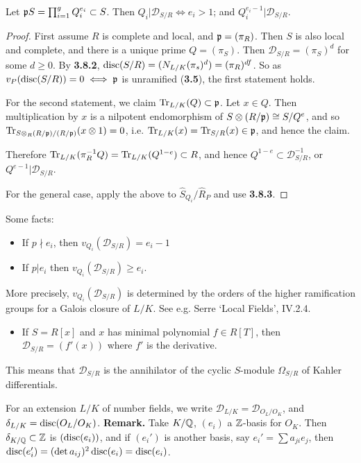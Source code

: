 \documentclass[10pt,a4paper]{article}
\begin{document}
\begin{theorem}
  Let $\mathfrak{p} S = \prod_{i=1}^g Q_i^{e_i} \subset S$. Then $Q_i | \mathscr{D}_{S/R} \iff e_i >1$; and $Q_i^{e_i-1}|\mathscr{D}_{S/R}$.
\end{theorem}
\begin{proof}
  First assume $R$ is complete and local, and $\mathfrak{p} = (\pi_R)$. Then $S$ is also local and complete, and there is a unique prime $Q = (\pi_S)$. Then $\mathscr{D}_{S/R} = (\pi_S)^d$ for some $d \geq 0$. By \textbf{3.8.2}, $\operatorname{disc}(S/R) = (N_{L/K}(\pi_s)^d) = (\pi_R)^{df}$. So as $v_P(\operatorname{disc}(S/R)) = 0 \iff \mathfrak{p}$ is unramified (\textbf{3.5}), the first statement holds.

  For the second statement, we claim $\operatorname{Tr}_{L/K}(Q) \subset \mathfrak{p}$. Let $x \in Q$. Then multiplication by $x$ is a nilpotent endomorphism of $S \otimes (R/\mathfrak{p}) \cong S/Q^e$, and so $\operatorname{Tr}_{S \otimes_R (R/\mathfrak{p})/(R/\mathfrak{p})}(x\otimes 1) = 0$, i.e. $\operatorname{Tr}_{L/K}(x) = \operatorname{Tr}_{S/R}(x) \in \mathfrak{p}$, and hence the claim.

  Therefore $\operatorname{Tr}_{L/K}(\pi_R^{-1}Q) = \operatorname{Tr}_{L/K}(Q^{1-e}) \subset R$, and hence $Q^{1-e} \subset \mathscr{D}_{S/R}^{-1}$, or $Q^{e-1}| \mathscr{D}_{S/R}$.

  For the general case, apply the above to $\hat{S}_{Q_i}/\hat{R}_P$ and use \textbf{3.8.3}.
\end{proof}
Some facts:
\begin{itemize}
  \item If $p\nmid e_i$, then $v_{Q_i}(\mathscr{D}_{S/R}) = e_i-1$
  \item If $p|e_i$ then $v_{Q_i}(\mathscr{D}_{S/R}) \geq e_i$.
\end{itemize}
More precisely, $v_{Q_i}(\mathscr{D}_{S/R})$ is determined by the orders of the higher ramification groups for a Galois closure of $L/K$. See e.g. Serre `Local Fields', IV.2.4.
\begin{itemize}
  \item If $S = R[x]$ and $x$ has minimal polynomial $f \in R[T]$, then $\mathscr{D}_{S/R} = (f'(x))$ where $f'$ is the derivative.
\end{itemize}
This means that $\mathscr{D}_{S/R}$ is the annihilator of the cyclic $S$-module $\Omega_{S/R}$ of Kahler differentials.

For an extension $L/K$ of number fields, we write $\mathscr{D}_{L/K} = \mathscr{D}_{O_L/O_K}$, and $\delta_{L/K} = \operatorname{disc}(O_L/O_K)$.
\textbf{Remark.} Take $K/\mathbb{Q}$, $(e_i)$ a $\mathbb{Z}$-basis for $O_K$. Then $\delta_{K/\mathbb{Q}} \subset \mathbb{Z}$ is $(\operatorname{disc}(e_i))$, and if $(e_i')$ is another basis, say $e_i' = \sum a_{ji}e_j$, then $\operatorname{disc}(e_i') = (\det a_{ij})^2 \operatorname{disc}(e_i) = \operatorname{disc}(e_i)$.
\end{document}
